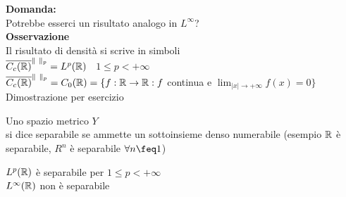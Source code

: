 \documentclass[12px]{article}
\begin{document}
	\textbf{Domanda:}\\
	Potrebbe esserci un risultato analogo in $L^\infty$?\\
	 \textbf{Osservazione}\\
	 Il risultato di densità si scrive in simboli\\
	 $\overline{C_c(\mathbb{R})}^{\|\ \|_p} = L^p(\mathbb{R})$ \  $1\leq p < +\infty$ \\
	 $\overline{C_c(\mathbb{R})}^{\|\ \|_p} = C_0(\mathbb{R}) = \{f: \mathbb{R} \rightarrow \mathbb{R}: f$ continua e $\lim_{|x| \rightarrow +\infty} f(x) =0 \}$ \\
	 Dimostrazione per esercizio
	
	 \begin{defi}
	 	Uno spazio metrico $Y$\\
		si dice separabile se ammette un sottoinsieme denso numerabile (esempio  $\mathbb{R}$ è separabile, $R^n$ è separabile $\forall n \feq 1$)  \\
	 \end{defi}
	 \begin{teo}
		 $L^p(\mathbb{R})$ è separabile per  $1\leq p < +\infty$\\
		  $L^\infty(\mathbb{R})$ non è separabile
	 \end{teo}
\end{document}
